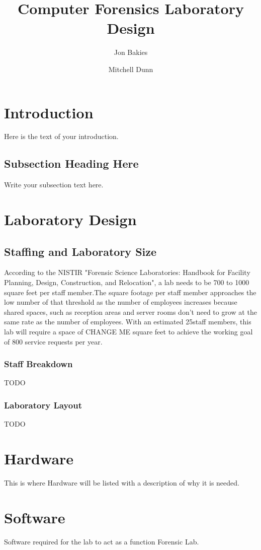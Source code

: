 \documentclass{article}
\begin{document}
\title{Computer Forensics Laboratory Design}
\author{Jon Bakies \and Mitchell Dunn} 

\maketitle
\newpage

\tableofcontents
\newpage

\section{Introduction}
Here is the text of your introduction.

\subsection{Subsection Heading Here}
Write your subsection text here.

\section{Laboratory Design}

\def\numberOfStaff{25}
\def\sqftPer{900}
\subsection{Staffing and Laboratory Size}
According to the NISTIR "Forensic Science Laboratories: Handbook for Facility Planning, Design, Construction, and Relocation", a lab needs to be 700 to 1000 square feet per staff member.The square footage per staff member approaches the low number of that threshold as the number of employees increases because shared spaces, such as reception areas and server rooms don't need to grow at the same rate as the number of employees.  With an estimated \numberOfStaff \space staff members, this lab will require a space of CHANGE ME square feet to achieve the working goal of 800 service requests per year.

\subsubsection{Staff Breakdown}
TODO
\subsubsection{Laboratory Layout}
TODO


\section{Hardware}
This is where Hardware will be listed with a description of why it is needed.

\section{Software}
Software required for the lab to act as a function Forensic Lab.
\end{document}
